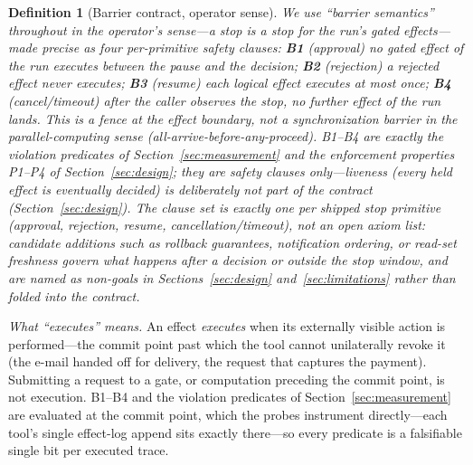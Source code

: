 \documentclass[10pt,journal,compsoc]{IEEEtran}
\newtheorem{definition}{Definition}
\begin{document}
\begin{definition}[Barrier contract, operator sense]
\label{def:barrier}
We use ``barrier semantics'' throughout in the operator's sense---a stop is a
stop for the run's gated effects---made precise as four per-primitive safety
clauses: \textbf{B1} (approval) no gated effect of the run executes between the
pause and the decision; \textbf{B2} (rejection) a rejected effect never
executes; \textbf{B3} (resume) each logical effect executes at most once;
\textbf{B4} (cancel/timeout) after the caller observes the stop, no further
effect of the run lands. This is a \emph{fence} at the effect boundary, not a
synchronization barrier in the parallel-computing sense
(all-arrive-before-any-proceed). B1--B4 are exactly the violation predicates of
Section~\ref{sec:measurement} and the enforcement properties P1--P4 of
Section~\ref{sec:design}; they are safety clauses only---\emph{liveness} (every
held effect is eventually decided) is deliberately not part of the contract
(Section~\ref{sec:design}). The clause set is exactly one per shipped stop
primitive (approval, rejection, resume, cancellation/timeout), not an open
axiom list: candidate additions such as rollback guarantees, notification
ordering, or read-set freshness govern what happens \emph{after} a decision
or outside the stop window, and are named as non-goals in
Sections~\ref{sec:design} and~\ref{sec:limitations} rather than folded into
the contract.
\end{definition}

\noindent\emph{What ``executes'' means.} An effect \emph{executes} when its
externally visible action is performed---the commit point past which the tool
cannot unilaterally revoke it (the e-mail handed off for delivery, the request
that captures the payment). Submitting a request to a gate, or computation
preceding the commit point, is not execution. B1--B4 and the violation
predicates of Section~\ref{sec:measurement} are evaluated at the commit
point, which the probes instrument directly---each tool's single effect-log
append sits exactly there---so every predicate is a falsifiable single bit
per executed trace.
\end{document}
